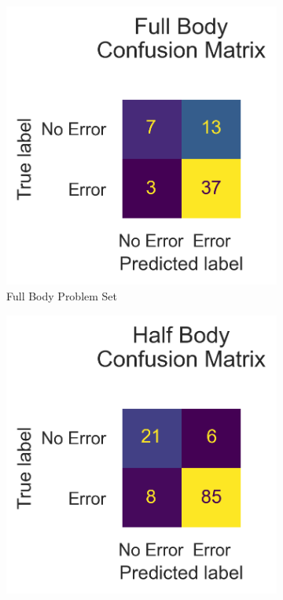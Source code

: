 \begin{figure}[ht]
  \centering
  \begin{subfigure}[b]{0.47\linewidth}
      \centering
      \includegraphics[width=\textwidth]{figures/Results/v1/confusion/full_together.png}
      \caption[]{Full Body Problem Set}
      \label{fig:fb_conf_v1}
  \end{subfigure}
  \hfill
  \begin{subfigure}[b]{0.47\linewidth}
      \centering
      \includegraphics[width=\textwidth]{figures/Results/v1/confusion/half_together.png}

\end{subfigure}
\end{figure}

